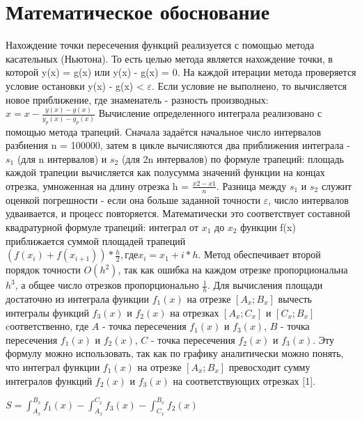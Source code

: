\documentclass[a4paper,12pt,titlepage,finall]{article}
\begin{document}
\newpage

\section{Математическое обоснование}
Нахождение точки пересечения функций реализуется с помощью метода касательных (Ньютона). То есть целью метода является нахождение точки, в которой y(x) = g(x) или y(x) - g(x) = 0. На каждой итерации метода проверяется условие остановки y(x) - g(x) < $\varepsilon$. Если условие не выполнено, то вычисляется новое приближение, где знаменатель - разность производных: $x = x - \frac{y(x) - g(x) }{y_p(x) - g_p(x)}$ \newline
Вычисление определенного интеграла реализовано с помощью метода трапеций. Сначала задаётся начальное число интервалов разбиения n = 100000, затем в цикле вычисляются два приближения интеграла - $s_1$ (для n интервалов) и $s_2$ (для 2n интервалов) по формуле трапеций: площадь каждой трапеции вычисляется как полусумма значений функции на концах отрезка, умноженная на длину отрезка h = $\frac{x2-x1}{n}$. Разница между $s_1$ и $s_2$ служит оценкой погрешности - если она больше заданной точности $\varepsilon$, число интервалов удваивается, и процесс повторяется. Математически это соответствует составной квадратурной формуле трапеций: интеграл от $x_1$ до $x_2$ функции f(x) приближается суммой площадей трапеций $(f(x_i) + f(x_{i+1}))*\frac{h}{2}, где x_i = x_1 + i*h$. Метод обеспечивает второй порядок точности $O(h^2)$, так как ошибка на каждом отрезке пропорциональна $h^3$, а общее число отрезков пропорционально $\frac{1}{h}$.  \newline
Для вычисления площади достаточно из интеграла функции $f_1(x)$ на отрезке 
$[A_x;B_x]$ вычесть интегралы функций $f_3(x)$ и $f_2(x)$ на отрезках $[A_x;C_x]$ и $[C_x; B_x]$ cоответственно, где $A$ - точка пересечения $f_1(x)$ и $f_3(x)$, $B$ - точка пересечения $f_1(x)$ и $f_2(x)$, $C$ - точка пересечения $f_2(x)$ и $f_3(x)$. Эту формулу можно использовать, так как по графику аналитически можно понять, что интеграл функции $f_1(x)$ на отрезке $[A_x;B_x]$ превосходит сумму интегралов функций $f_2(x)$ и $f_3(x)$ на соответствующих отрезках [1].

$S = \int_{A_x}^{B_x} f_1(x) -  \int_{A_x}^{C_x} f_3(x) -  \int_{C_x}^{B_x} f_2(x)$
\end{document}
